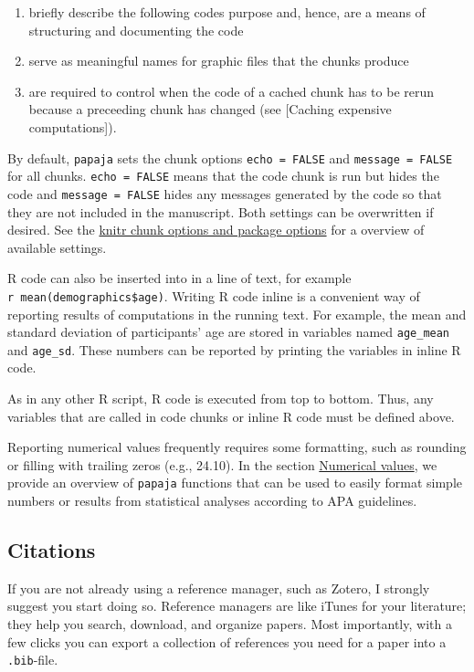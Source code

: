 \documentclass[man,floatsintext]{apa6}
\providecommand{\tightlist}{%
  \setlength{\itemsep}{0pt}\setlength{\parskip}{0pt}}
\theoremstyle{definition}
\theoremstyle{definition}
\theoremstyle{definition}
\theoremstyle{remark}
\begin{document}
\begin{enumerate}
\def\labelenumi{\arabic{enumi}.}
\tightlist
\item
  briefly describe the following codes purpose and, hence, are a means
  of structuring and documenting the code
\item
  serve as meaningful names for graphic files that the chunks produce
\item
  are required to control when the code of a cached chunk has to be
  rerun because a preceeding chunk has changed (see {[}Caching expensive
  computations{]}).
\end{enumerate}

By default, \texttt{papaja} sets the chunk options
\texttt{echo\ =\ FALSE} and \texttt{message\ =\ FALSE} for all chunks.
\texttt{echo\ =\ FALSE} means that the code chunk is run but hides the
code and \texttt{message\ =\ FALSE} hides any messages generated by the
code so that they are not included in the manuscript. Both settings can
be overwritten if desired. See the
\href{https://yihui.name/knitr/options/}{knitr chunk options and package
options} for a overview of available settings.

R code can also be inserted into in a line of text, for example
\texttt{\textasciigrave{}r\ mean(demographics\$age)\textasciigrave{}}.
Writing R code inline is a convenient way of reporting results of
computations in the running text. For example, the mean and standard
deviation of participants' age are stored in variables named
\texttt{age\_mean} and \texttt{age\_sd}. These numbers can be reported
by printing the variables in inline R code.

As in any other R script, R code is executed from top to bottom. Thus,
any variables that are called in code chunks or inline R code must be
defined above.

Reporting numerical values frequently requires some formatting, such as
rounding or filling with trailing zeros (e.g., 24.10). In the section
\protect\hyperlink{numerical-values}{Numerical values}, we provide an
overview of \texttt{papaja} functions that can be used to easily format
simple numbers or results from statistical analyses according to APA
guidelines.

\hypertarget{citations}{\subsection{Citations}\label{citations}}

If you are not already using a reference manager, such as Zotero, I
strongly suggest you start doing so. Reference managers are like iTunes
for your literature; they help you search, download, and organize
papers. Most importantly, with a few clicks you can export a collection
of references you need for a paper into a \texttt{.bib}-file.
\end{document}
